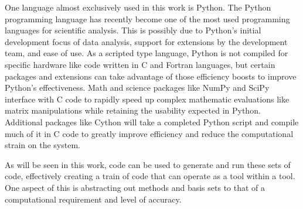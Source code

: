 One language almost exclusively used in this work is Python.\cite{Python} 
The Python programming language has recently become one of the most used programming languages for scientific analysis.
This is possibly due to Python's initial development focus of data analysis, support for extensions by the development team, and ease of use.
As a scripted type language, Python is not compiled for specific hardware like code written in C and Fortran languages, but certain packages and extensions can take advantage of those efficiency boosts to improve Python's effectiveness.
Math and science packages like NumPy\cite{NumPy} and SciPy\cite{SciPy} interface with C code to rapidly speed up complex mathematic evaluations like matrix manipulations while retaining the usability expected in Python.
Additional packages like Cython\cite{Cython} will take a completed Python script and compile much of it in C code to greatly improve efficiency and reduce the computational strain on the system.

As will be seen in this work, code can be used to generate and run these sets of code, effectively creating a train of code that can operate as a tool within a tool. 
One aspect of this is abstracting out methods and basis sets to that of a computational requirement and level of accuracy.














